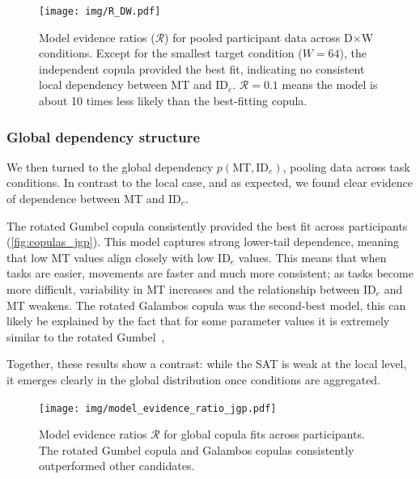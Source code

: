 \documentclass[acmlarge, manuscript,review]{acmart}
\newcommand{\mt}{\ensuremath{{\text{MT}}}\xspace}
\newcommand{\ide}{\ensuremath{{\text{ID}_e}}\xspace}
\begin{document}

\begin{figure}[htbp]
	\centering
	\texttt{[image: img/R\_DW.pdf]}
	\caption{Model evidence ratios ($\mathcal{R}$) for pooled participant data across D$\times$W conditions. Except for the smallest target condition ($W=64$), the independent copula provided the best fit, indicating no consistent local dependency between MT and \ide. $\mathcal{R}=0.1$ means the model is about 10 times less likely than the best-fitting copula.}
	\label{fig:copula_fit_jgp_dw}
\end{figure}


\subsubsection{Global dependency structure}
We then turned to the global dependency $p(\mt, \ide)$, pooling data across task conditions. In contrast to the local case, and as expected, we found clear evidence of dependence between MT and \ide. 

The rotated Gumbel copula consistently provided the best fit across participants (\autoref{fig:copulas_jgp}). This model captures strong lower-tail dependence, meaning that low MT values align closely with low \ide values. This means that when tasks are easier, movements are faster and much more consistent; as tasks become more difficult, variability in MT increases and the relationship between \ide and MT weakens. The rotated Galambos copula was the second-best model, this can likely be explained by the fact that for some parameter values it is extremely similar to the rotated Gumbel~\cite{genest2017},

Together, these results show a contrast: while the SAT is weak at the local level, it emerges clearly in the global distribution once conditions are aggregated.

\begin{figure}[htbp]
	\centering
	\texttt{[image: img/model\_evidence\_ratio\_jgp.pdf]}
	\caption{Model evidence ratios $\mathcal{R}$ for global copula fits across participants. The rotated Gumbel copula and Galambos copulas consistently outperformed other candidates.}
	\label{fig:copulas_jgp}
\end{figure}
\end{document}
